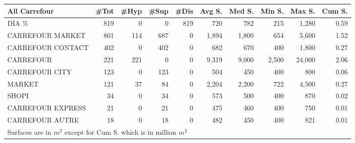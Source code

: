 \documentclass[11pt]{article}
\begin{document}
\begin{table}[H]
\footnotesize
\setlength{\tabcolsep}{2pt}

\begin{tabular}{lrrrrrrrrr}
\toprule
All Carrefour &       \#Tot &       \#Hyp &       \#Sup &       \#Dis &     Avg S. &     Med S. &     Min S. &     Max S. &     Cum S. \\
\midrule
DIA \%             &        819 &          0 &          0 &        819 &        720 &        782 &        215 &      1,280 &       0.59 \\
CARREFOUR MARKET  &        801 &        114 &        687 &          0 &      1,894 &      1,800 &        654 &      5,600 &       1.52 \\
CARREFOUR CONTACT &        402 &          0 &        402 &          0 &        682 &        670 &        400 &      1,800 &       0.27 \\
CARREFOUR         &        221 &        221 &          0 &          0 &      9,319 &      9,000 &      2,500 &     24,000 &       2.06 \\
CARREFOUR CITY    &        123 &          0 &        123 &          0 &        504 &        450 &        400 &        800 &       0.06 \\
MARKET            &        121 &         37 &         84 &          0 &      2,204 &      2,200 &        722 &      4,500 &       0.27 \\
SHOPI             &         34 &          0 &         34 &          0 &        573 &        500 &        400 &        870 &       0.02 \\
CARREFOUR EXPRESS &         21 &          0 &         21 &          0 &        475 &        460 &        400 &        750 &       0.01 \\
CARREFOUR AUTRE   &         18 &          0 &         18 &          0 &        482 &        450 &        400 &        821 &       0.01 \\
\bottomrule
\multicolumn{10}{l}{\footnotesize Surfaces are in $m^2$ except for Cum S. which is in million $m^2$} \\
\end{tabular}

\end{table}
\end{document}
